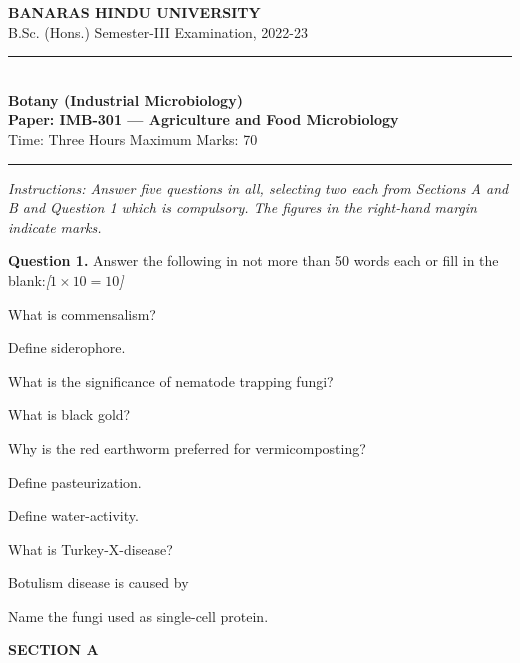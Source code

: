 \documentclass[11pt,a4paper]{article}
\newcommand{\pts}[1]{\hfill   \textit{[#1]}}
\begin{document}
\begin{center}
  {\large\bfseries BANARAS HINDU UNIVERSITY}\\[2pt]
  {\normalsize B.Sc. (Hons.) Semester-III Examination, 2022-23}\\[6pt]
  \rule{0.8\linewidth}{0.5pt}\\[6pt]
  {\large\bfseries Botany (Industrial Microbiology)}\\[4pt]
  {\large\bfseries Paper: IMB-301 --- Agriculture and Food Microbiology}\\[4pt]
  {\normalsize Time: Three Hours \hfill Maximum Marks: 70}
\end{center}

\rule{\linewidth}{0.4pt}

\smallskip



\noindent   \textit{Instructions: Answer five questions in all, selecting two each from Sections A and B and Question 1 which is compulsory. The figures in the right-hand margin indicate marks.}

\bigskip

\medskip


\noindent   \textbf{Question 1.} Answer the following in not more than 50 words each or fill in the blank:\pts{$1  \times 10 = 10$}

\begin{parts}
  \item What is commensalism?
  \item Define siderophore.
  \item What is the significance of nematode trapping fungi?
  \item What is black gold?
  \item Why is the red earthworm preferred for vermicomposting?
  \item Define pasteurization.
  \item Define water-activity.
  \item What is Turkey-X-disease?
  \item Botulism disease is caused by \makebox[2cm]{\hrulefill}
  \item Name the fungi used as single-cell protein.
\end{parts}

\bigskip

\begin{center}
   \textbf{SECTION A}
\end{center}
\medskip

\medskip
\end{document}
